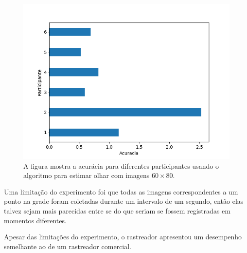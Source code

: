 \begin{figure}
    \centering
    \includegraphics[scale=.6]{imagens/errosParticipantes_pyrDown3.png}
    \caption{A figura mostra a acurácia para diferentes participantes usando o algoritmo para estimar olhar com imagens $60 \times 80$.}
    \label{fig:erros_participante}
\end{figure}

Uma limitação do experimento foi que todas as imagens correspondentes a um ponto na grade foram coletadas durante um intervalo de um segundo, então elas talvez sejam mais parecidas entre se do que seriam se fossem registradas em momentos diferentes.

Apesar das limitações do experimento, o rastreador apresentou um desempenho semelhante ao de um rastreador comercial.